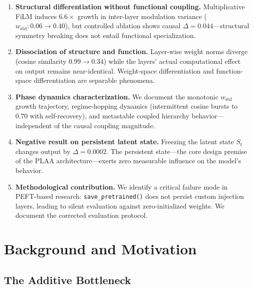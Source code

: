\documentclass[11pt,a4paper]{article}
\newcommand{\St}{S_t}
\begin{document}
\begin{enumerate}[leftmargin=*, label=\textbf{\arabic*.}]

  \item \textbf{Structural differentiation without functional coupling.}
    Multiplicative FiLM induces $6.6\times$ growth in inter-layer modulation variance
    ($w_{\mathrm{std}}: 0.06 \to 0.40$), but controlled ablation shows causal
    $\Delta = 0.044$---structural symmetry breaking does not entail functional
    specialization.

  \item \textbf{Dissociation of structure and function.}
    Layer-wise weight norms diverge (cosine similarity $0.99 \to 0.34$) while the
    layers' actual computational effect on output remains near-identical. Weight-space
    differentiation and function-space differentiation are separable phenomena.

  \item \textbf{Phase dynamics characterization.}
    We document the monotonic $w_{\mathrm{std}}$ growth trajectory, regime-hopping
    dynamics (intermittent cosine bursts to $0.70$ with self-recovery), and metastable
    coupled hierarchy behavior---independent of the causal coupling magnitude.

  \item \textbf{Negative result on persistent latent state.}
    Freezing the latent state $\St$ changes output by $\Delta = 0.0002$. The
    persistent state---the core design premise of the PLAA architecture---exerts zero
    measurable influence on the model's behavior.

  \item \textbf{Methodological contribution.}
    We identify a critical failure mode in PEFT-based research: \texttt{save\_pretrained()}
    does not persist custom injection layers, leading to silent evaluation against
    zero-initialized weights. We document the corrected evaluation protocol.

\end{enumerate}

\section{Background and Motivation}

\subsection{The Additive Bottleneck}
\end{document}
